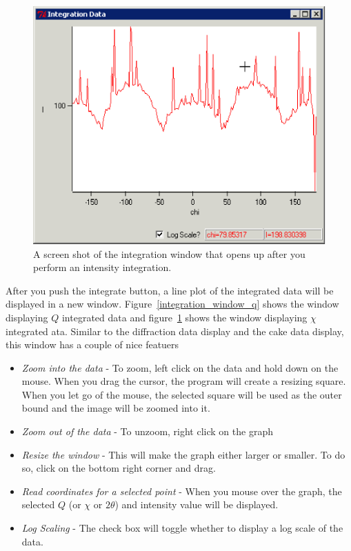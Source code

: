 \begin{figure}
    \centering
    \includegraphics[scale=.75]{figures/integration_window_chi.eps}
    \caption{A screen shot of the integration window that
    opens up after you perform an intensity integration.} 
    \label{integration_window_chi}
\end{figure}

After you push the integrate button, a line plot of the 
integrated data will be displayed in a new window. 
Figure~\ref{integration_window_q} shows 
the window displaying $Q$ integrated data
and figure~\ref{integration_window_chi} shows the
window displaying $\chi$ integrated ata.
Similar to the diffraction data display and the cake 
data display, this window has a couple of nice featuers
\begin{itemize}
    \item {\em Zoom into the data} - To zoom, left click
    on the data and hold down on the mouse. When you drag 
    the cursor, the program will create a resizing square. 
    When you let go of the mouse, the selected square will 
    be used as the outer bound and the image will be zoomed 
    into it. 
    \item {\em Zoom out of the data} - To unzoom, right
    click on the graph
    \item {\em Resize the window} - This will make the graph
    either larger or smaller. To do so, click on the bottom 
    right corner and drag. 
    \item {\em Read coordinates for a selected point} -
    When you mouse over the graph, the selected $Q$ (or $\chi$
    or $2\theta$) and intensity value will be displayed.
    \item {\em Log Scaling} - The  check box
    will toggle whether to display a log scale of the data.
\end{itemize}


